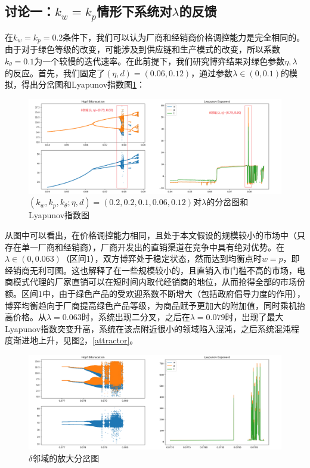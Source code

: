 \documentclass{article}
\begin{document}
\subsection{讨论一：$k_w=k_p$情形下系统对$\lambda$的反馈}
\par 在$k_w=k_p=0.2$条件下，我们可以认为厂商和经销商价格调控能力是完全相同的。由于对于绿色等级的改变，可能涉及到供应链和生产模式的改变，所以系数$k_\theta=0.1$为一个较慢的迭代速率。在此前提下，我们研究博弈结果对绿色参数$\eta, \lambda$的反应。首先，我们固定了$(\eta,d)=(0.06,0.12)$，通过参数$\lambda\in(0,0.1)$的模拟，得出分岔图和Lyapunov指数图\ref{Hopf_Lyapunov_1_1}：
\begin{figure}[htp]
    \centering
    \includegraphics[width=16.5cm]{Hopf_Lyapunov_1_1.png}
    \caption{$(k_w,k_p,k_\theta;\eta,d)=(0.2,0.2,0.1,0.06,0.12)$对$\lambda$的分岔图和Lyapunov指数图}
    \label{Hopf_Lyapunov_1_1}
\end{figure}
\par 从图中可以看出，在价格调控能力相同，且处于本文假设的规模较小的市场中（只存在单一厂商和经销商），厂商开发出的直销渠道在竞争中具有绝对优势。在$\lambda\in(0,0.063)$（区间1），双方博弈处于稳定状态，然而达到均衡点时$w=p$，即经销商无利可图。这也解释了在一些规模较小的，且直销入市门槛不高的市场，电商模式代理的厂家直销可以在短时间内取代经销商的地位，从而抢得全部的市场份额。区间1中，由于绿色产品的受欢迎系数不断增大（包括政府倡导力度的作用），博弈均衡趋向于厂商提高绿色产品等级，为商品赋予更加大的附加值，同时乘机抬高价格。从$\lambda=0.063$时，系统出现二分叉，之后在$\lambda=0.079$时，出现了最大Lyapunov指数突变升高，系统在该点附近很小的领域陷入混沌，之后系统混沌程度渐进地上升，见图\ref{Hopf_Lyapunov_1_2}，\ref{attractor}。
\begin{figure}[htp]
    \centering
    \includegraphics[width=16.5cm]{Hopf_Lyapunov_1_2.png}
    \caption{$\delta$邻域的放大分岔图}
    \label{Hopf_Lyapunov_1_2}
\end{figure}
\end{document}
